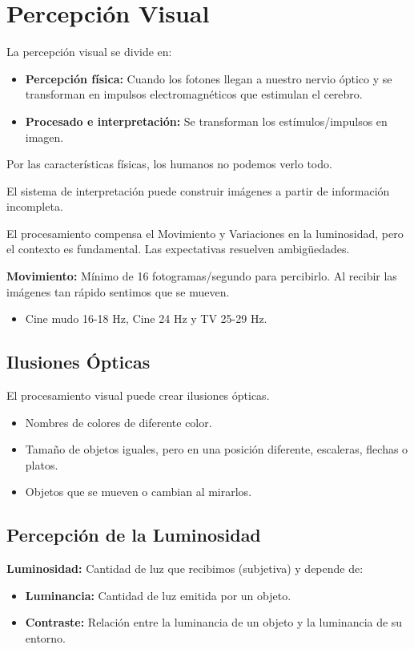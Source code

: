 \chapter{Percepción Visual}
La percepción visual se divide en:
\begin{itemize}
	\item \textbf{Percepción física:} Cuando los fotones llegan a nuestro nervio óptico y se transforman en impulsos electromagnéticos que estimulan el cerebro.
	\item \textbf{Procesado e interpretación:} Se transforman los estímulos/impulsos en imagen.
\end{itemize}

Por las características físicas, los humanos no podemos verlo todo.

El sistema de interpretación puede construir imágenes a partir de información incompleta.

El procesamiento compensa el Movimiento y Variaciones en la luminosidad, pero el contexto es fundamental. Las expectativas resuelven ambigüedades.

\textbf{Movimiento:} Mínimo de 16 fotogramas/segundo para percibirlo. Al recibir las imágenes tan rápido sentimos que se mueven.
\begin{itemize}
	\item Cine mudo 16-18 Hz, Cine 24 Hz y TV 25-29 Hz.
\end{itemize}

\section{Ilusiones Ópticas}
El procesamiento visual puede crear ilusiones ópticas.
\begin{itemize}
	\item Nombres de colores de diferente color.
	\item Tamaño de objetos iguales, pero en una posición diferente, escaleras, flechas o platos.
	\item Objetos que se mueven o cambian al mirarlos.
\end{itemize}

\section{Percepción de la Luminosidad}
\textbf{Luminosidad:} Cantidad de luz que recibimos (subjetiva) y depende de:
\begin{itemize}
	\item \textbf{Luminancia:} Cantidad de luz emitida por un objeto.
	\item \textbf{Contraste:} Relación entre la luminancia de un objeto y la luminancia de su entorno.
\end{itemize}

